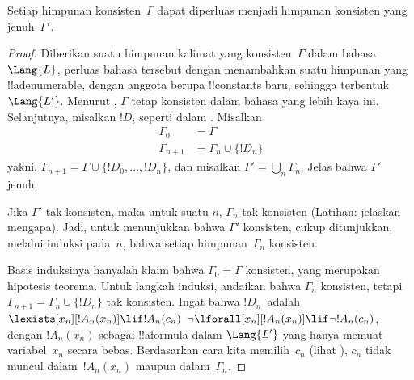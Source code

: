 \documentclass[../../../include/open-logic-section]{subfiles}
\begin{document}
\begin{lem}
Setiap himpunan konsisten~$\Gamma$ dapat diperluas menjadi himpunan
konsisten yang jenuh~$\Gamma'$.
\end{lem}

\begin{proof}
Diberikan suatu himpunan kalimat yang konsisten~$\Gamma$ dalam
bahasa~$\Lang{L}$, perluas bahasa tersebut dengan menambahkan suatu
himpunan yang !!a{denumerable}, dengan anggota berupa !!{constant}s baru,
sehingga terbentuk~$\Lang{L'}$.
Menurut , $\Gamma$ tetap konsisten dalam bahasa yang
lebih kaya ini. Selanjutnya, misalkan $!D_i$ seperti dalam
. Misalkan
\begin{align*}
\Gamma_0 & = \Gamma \\
\Gamma_{n+1} & = \Gamma_n \cup \{!D_n \}
\end{align*}
yakni, $\Gamma_{n+1} = \Gamma \cup \{ !D_0, \dots, !D_n \}$, dan
misalkan $\Gamma' = \bigcup_{n} \Gamma_n$. Jelas bahwa $\Gamma'$ jenuh.

Jika $\Gamma'$ tak konsisten, maka untuk suatu $n$, $\Gamma_n$ tak
konsisten (Latihan: jelaskan mengapa). Jadi, untuk menunjukkan bahwa
$\Gamma'$ konsisten, cukup ditunjukkan, melalui induksi pada~$n$, bahwa
setiap himpunan~$\Gamma_n$ konsisten.

Basis induksinya hanyalah klaim bahwa $\Gamma_0 = \Gamma$ konsisten,
yang merupakan hipotesis teorema. Untuk langkah induksi, andaikan bahwa
$\Gamma_{n}$ konsisten, tetapi $\Gamma_{n+1} = \Gamma_n \cup \{!D_n\}$
tak konsisten. Ingat bahwa $!D_n$~adalah
{$\lexists[x_{n}][!A_{n}(x_n)] \lif !A_{n}(c_{n})$}
{$\lnot\lforall[x_{n}][!A_{n}(x_n)] \lif \lnot !A_{n}(c_{n})$},
dengan $!A_n(x_n)$ sebagai !!a{formula} dalam $\Lang{L'}$ yang hanya
memuat variabel~$x_n$ secara bebas. Berdasarkan cara kita memilih~$c_n$
(lihat ), $c_n$ tidak muncul dalam~$!A_n(x_n)$
maupun dalam~$\Gamma_n$.


\end{proof}
\end{document}
